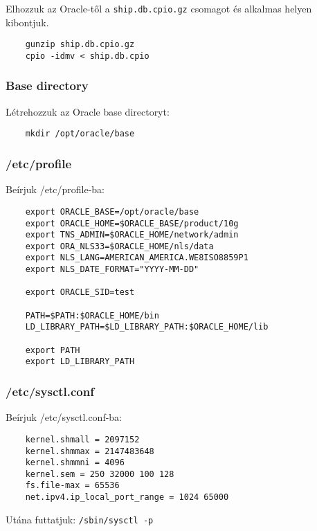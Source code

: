 Elhozzuk az Oracle-től a \verb!ship.db.cpio.gz! csomagot
és alkalmas helyen kibontjuk.

\begin{verbatim}
    gunzip ship.db.cpio.gz
    cpio -idmv < ship.db.cpio
\end{verbatim}

\subsubsection*{Base directory}

Létrehozzuk az Oracle base directoryt:

\begin{verbatim}
    mkdir /opt/oracle/base
\end{verbatim}



\subsubsection*{/etc/profile}

Beírjuk /etc/profile-ba:


\begin{verbatim}
    export ORACLE_BASE=/opt/oracle/base
    export ORACLE_HOME=$ORACLE_BASE/product/10g
    export TNS_ADMIN=$ORACLE_HOME/network/admin
    export ORA_NLS33=$ORACLE_HOME/nls/data
    export NLS_LANG=AMERICAN_AMERICA.WE8ISO8859P1
    export NLS_DATE_FORMAT="YYYY-MM-DD"

    export ORACLE_SID=test

    PATH=$PATH:$ORACLE_HOME/bin
    LD_LIBRARY_PATH=$LD_LIBRARY_PATH:$ORACLE_HOME/lib

    export PATH
    export LD_LIBRARY_PATH
\end{verbatim}


\subsubsection*{/etc/sysctl.conf}

Beírjuk /etc/sysctl.conf-ba:

\begin{verbatim}
    kernel.shmall = 2097152
    kernel.shmmax = 2147483648
    kernel.shmmni = 4096
    kernel.sem = 250 32000 100 128
    fs.file-max = 65536
    net.ipv4.ip_local_port_range = 1024 65000
\end{verbatim}

Utána futtatjuk: \verb!/sbin/sysctl -p!


